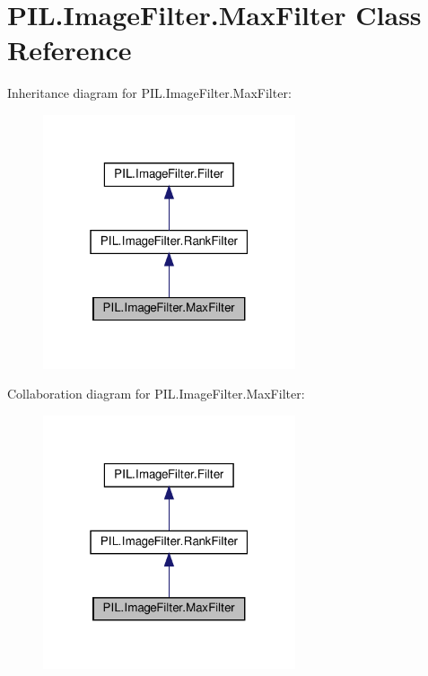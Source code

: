 \hypertarget{classPIL_1_1ImageFilter_1_1MaxFilter}{}\section{P\+I\+L.\+Image\+Filter.\+Max\+Filter Class Reference}
\label{classPIL_1_1ImageFilter_1_1MaxFilter}


Inheritance diagram for P\+I\+L.\+Image\+Filter.\+Max\+Filter\+:
\nopagebreak
\begin{figure}[H]
\begin{center}
\leavevmode
\includegraphics[width=211pt]{classPIL_1_1ImageFilter_1_1MaxFilter__inherit__graph}
\end{center}
\end{figure}


Collaboration diagram for P\+I\+L.\+Image\+Filter.\+Max\+Filter\+:
\nopagebreak
\begin{figure}[H]
\begin{center}
\leavevmode
\includegraphics[width=211pt]{classPIL_1_1ImageFilter_1_1MaxFilter__coll__graph}
\end{center}
\end{figure}
